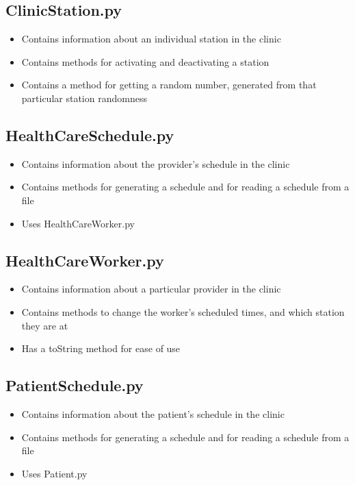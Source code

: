 \documentclass[12pt]{article}
\begin{document}
\subsection{ClinicStation.py}
\begin{itemize}  
\item Contains information about an individual station in the clinic
\item Contains methods for activating and deactivating a station
\item Contains a method for getting a random number, generated from that particular station randomness
\end{itemize}

\subsection{HealthCareSchedule.py}
\begin{itemize}  
\item Contains information about the provider's schedule in the clinic
\item Contains methods for generating a schedule and for reading a schedule from a file
\item Uses HealthCareWorker.py
\end{itemize}

\subsection{HealthCareWorker.py}
\begin{itemize}  
\item Contains information about a particular provider in the clinic
\item Contains methods to change the worker's scheduled times, and which station they are at
\item Has a toString method for ease of use
\end{itemize}

\subsection{PatientSchedule.py}
\begin{itemize}  
\item Contains information about the patient's schedule in the clinic
\item Contains methods for generating a schedule and for reading a schedule from a file
\item Uses Patient.py
\end{itemize}
\end{document}
